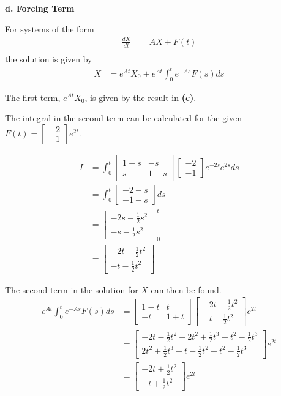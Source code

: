 \documentclass[a4paper,11pt]{article}
\begin{document}
\textbf{d. Forcing Term}

For systems of the form
\begin{align*}
\frac{dX}{dt} &= AX + F(t)\\
\end{align*}
the solution is given by
\begin{align*}
X &= e^{At}X_0 + e^{At} \int^t_0 e^{-As} F(s) ds
\end{align*}

The first term, $e^{At}X_0$, is given by the result in \textbf{(c)}.

The integral in the second term can be calculated for the given $F(t) = \begin{bmatrix}-2 \\-1\end{bmatrix} e^{2t}$.

\begin{align*}
I &= \int^t_0 \begin{bmatrix}
1 + s & -s\\
s & 1 - s
\end{bmatrix}\begin{bmatrix}
-2\\
-1
\end{bmatrix} e^{-2s}e^{2s}ds\\
&= \int^t_0 \begin{bmatrix}
-2 - s \\
-1 - s
\end{bmatrix}ds\\
&= \begin{bmatrix}
-2s - \frac{1}{2}s^2 \\
-s - \frac{1}{2}s^2
\end{bmatrix}^t_0\\
&= \begin{bmatrix}
-2t - \frac{1}{2} t^2\\
-t - \frac{1}{2} t^2
\end{bmatrix}
\end{align*}

The second term in the solution for $X$ can then be found.
\begin{align*}
e^{At} \int^t_0 e^{-As} F(s) ds &= \begin{bmatrix}
1 - t & t \\
-t & 1 + t
\end{bmatrix}\begin{bmatrix}
-2t - \frac{1}{2} t^2\\
-t - \frac{1}{2} t^2
\end{bmatrix} e^{2t}\\
&= \begin{bmatrix}
-2t - \frac{1}{2}t^2 + 2t^2 + \frac{1}{2}t^3 - t^2 - \frac{1}{2}t^3\\
2t^2 + \frac{1}{2}t^3 - t - \frac{1}{2}t^2 - t^2 - \frac{1}{2}t^3
\end{bmatrix} e^{2t}\\
&= \begin{bmatrix}
-2t + \frac{1}{2}t^2\\
-t + \frac{1}{2}t^2
\end{bmatrix} e^{2t}
\end{align*}
\end{document}
